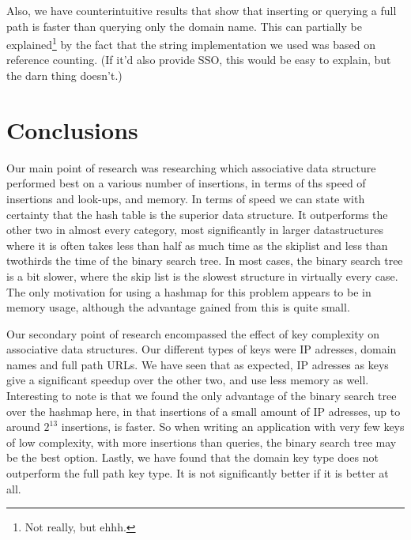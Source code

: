\documentclass[12pt,a4paper]{article}
\begin{document}
    Also, we have counterintuitive results that show that inserting or querying a full path is
    faster than querying only the domain name.  This can partially be explained\footnote{Not really,
    but ehhh.} by the fact that the string implementation we used was based on reference counting.
    (If it'd also provide SSO, this would be easy to explain, but the darn thing doesn't.)


    \section{Conclusions}
    Our main point of research was researching which associative data structure performed best on
    a various number of insertions, in terms of ths speed of insertions and look-ups, and memory.
    In terms of speed we can state with certainty that the hash table is the superior data structure.
    It outperforms the other two in almost every category, most significantly in larger datastructures where
    it is often takes less than half as much time as the skiplist and less than twothirds the time of the binary search tree.
    In most cases, the binary search tree is a bit slower, where the skip list is the slowest structure in
    virtually every case. The only motivation for using a hashmap for this problem appears to be in memory usage,
    although the advantage gained from this is quite small.
    
    Our secondary point of research encompassed the effect of key complexity on associative data structures.
    Our different types of keys were IP adresses, domain names and full path URLs. We have seen that as expected,
    IP adresses as keys give a significant speedup over the other two, and use less memory as well. Interesting to
    note is that we found the only advantage of the binary search tree over the hashmap here, in that insertions of
    a small amount of IP adresses, up to around $2^13$ insertions, is faster. So when writing an application with very
    few keys of low complexity, with more insertions than queries, the binary search tree may be the best option. Lastly,
    we have found that the domain key type does not outperform the full path key type. It is not significantly better
    if it is better at all.
    
\end{document}
